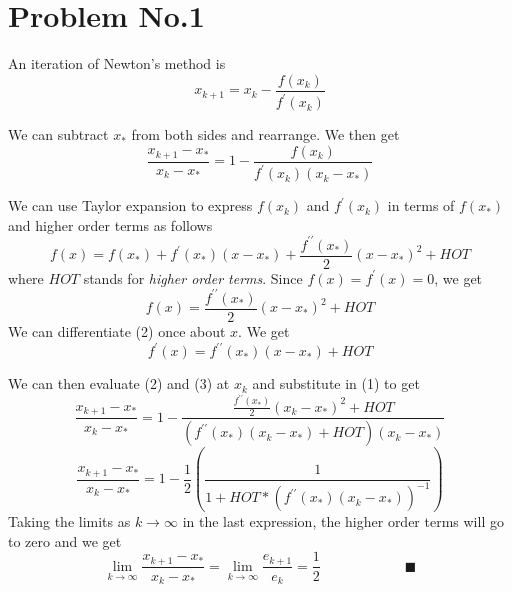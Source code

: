 \section*{Problem No.1} \label{sec:prob1}

An iteration of Newton's method is 
\[
x_{k+1} = x_{k} - \frac{f(x_{k})}{f^{\prime}(x_{k})} 
\]

We can subtract $x_{*}$ from both sides and rearrange. We then get
\begin{equation}
\frac{x_{k+1} -x_{*}}{x_{k} -x_{*}} = 1 - \frac{f(x_{k})}{f^{\prime}(x_{k}) (x_{k}-x_{*})} 
\end{equation}


We can use Taylor expansion to express $f(x_{k})$ and $f^{\prime}(x_{k})$ in terms of $f(x_{*})$ and higher order terms as follows
\[
f(x) = f(x_{*}) + f^{\prime}(x_{*})(x-x_{*}) + \frac{f^{\prime \prime}(x_{*})}{2}(x-x_{*})^{2}+HOT 
\] 
where $HOT$ stands for \emph{higher order terms}. Since $f(x)=f^{\prime}(x)=0$, we get
\begin{equation}
f(x) = \frac{f^{\prime \prime}(x_{*})}{2}(x-x_{*})^{2}+HOT
\end{equation}
We can differentiate (2) once about $x$. We get
\begin{equation}
f^{\prime}(x) = f^{\prime \prime}(x_{*})(x-x_{*})+HOT
\end{equation}

We can then evaluate (2) and (3) at $x_{k}$ and substitute in (1) to get
\[
\frac{x_{k+1} -x_{*}}{x_{k} -x_{*}} = 1 - \frac{  \frac{f^{\prime \prime}(x_{*})}{2}(x_{k}-x_{*})^{2}+HOT }{ (f^{\prime \prime}(x_{*})(x_{k}-x_{*})+HOT) (x_{k}-x_{*})}
\]
\[
\frac{x_{k+1} -x_{*}}{x_{k} -x_{*}} = 1 - \frac{1}{2} \left( \frac{1}{1 + HOT*(f^{\prime \prime}(x_{*})(x_{k}-x_{*}))^{-1}}\right)
\]
Taking the limits as $k\rightarrow \infty$ in the last expression, the higher order terms will go to zero and we get 
$$
\lim_{k \to \infty} \frac{x_{k+1} -x_{*}}{x_{k} -x_{*}} = \lim_{k \to \infty} \frac{e_{k+1}}{e_{k}} = \frac{1}{2} \qquad \qquad \qquad \blacksquare
$$